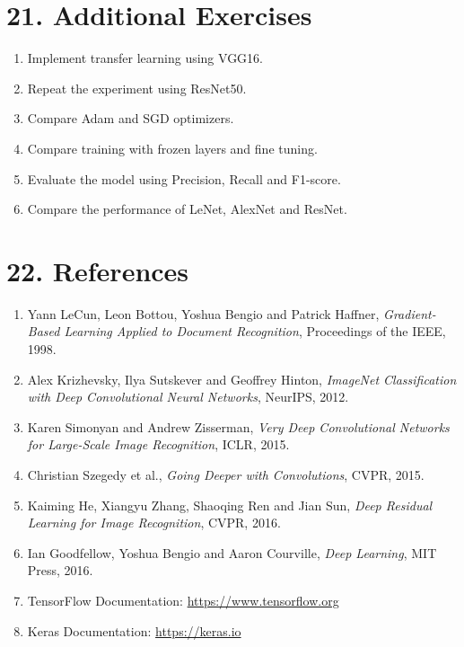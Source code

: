 \documentclass[11pt]{article}
\begin{document}

\section*{21. Additional Exercises}

\begin{enumerate}

\item Implement transfer learning using VGG16.

\item Repeat the experiment using ResNet50.

\item Compare Adam and SGD optimizers.

\item Compare training with frozen layers and fine tuning.

\item Evaluate the model using Precision, Recall and F1-score.

\item Compare the performance of LeNet, AlexNet and ResNet.

\end{enumerate}


\section*{22. References}

\begin{enumerate}

\item Yann LeCun, Leon Bottou, Yoshua Bengio and Patrick Haffner,
\emph{Gradient-Based Learning Applied to Document Recognition},
Proceedings of the IEEE, 1998.

\item Alex Krizhevsky, Ilya Sutskever and Geoffrey Hinton,
\emph{ImageNet Classification with Deep Convolutional Neural Networks},
NeurIPS, 2012.

\item Karen Simonyan and Andrew Zisserman,
\emph{Very Deep Convolutional Networks for Large-Scale Image Recognition},
ICLR, 2015.

\item Christian Szegedy et al.,
\emph{Going Deeper with Convolutions},
CVPR, 2015.

\item Kaiming He, Xiangyu Zhang, Shaoqing Ren and Jian Sun,
\emph{Deep Residual Learning for Image Recognition},
CVPR, 2016.

\item Ian Goodfellow, Yoshua Bengio and Aaron Courville,
\emph{Deep Learning},
MIT Press, 2016.

\item TensorFlow Documentation:
\url{https://www.tensorflow.org}

\item Keras Documentation:
\url{https://keras.io}

\end{enumerate}

\end{document}
